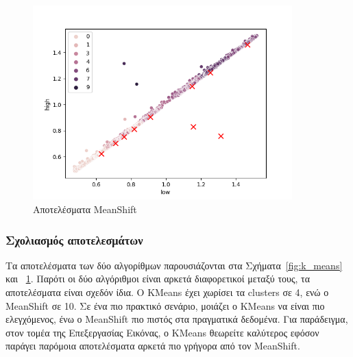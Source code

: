 \begin{figure}[H]
  \centering
  \includegraphics[width=100mm]{Figures/mean_shift_cluster.png}
  \caption{Αποτελέσματα MeanShift}
  \label{fig:mean_shift}
\end{figure}

\subsubsection{Σχολιασμός αποτελεσμάτων}
\label{chap:results}

Τα αποτελέσματα των δύο αλγορίθμων παρουσιάζονται στα Σχήματα~\ref{fig:k_means} και ~\ref{fig:mean_shift}. Παρότι οι δύο αλγόριθμοι είναι αρκετά διαφορετικοί μεταξύ τους, τα αποτελέσματα είναι σχεδόν ίδια. Ο KMeans έχει χωρίσει τα clusters σε 4, ενώ ο MeanShift σε 10. Σε ένα πιο πρακτικό σενάριο, μοιάζει ο KMeans να είναι πιο ελεγχόμενος, ένω ο MeanShift πιο πιστός στα πραγματικά δεδομένα. Για παράδειγμα, στον τομέα της Επεξεργασίας Εικόνας, ο KMeans θεωρείτε καλύτερος εφόσον παράγει παρόμοια αποτελέσματα αρκετά πιο γρήγορα από τον MeanShift.

